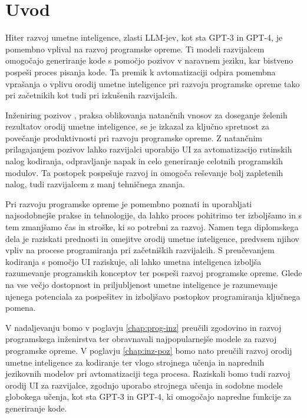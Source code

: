 \documentclass[a4paper,12pt,openright]{book}
\begin{document}
\chapter{Uvod}

Hiter razvoj umetne inteligence, zlasti LLM-jev, kot sta GPT-3 in GPT-4, je pomembno vplival na razvoj programske opreme. Ti modeli razvijalcem omogočajo generiranje kode s pomočjo pozivov v naravnem jeziku, kar bistveno pospeši proces pisanja kode. Ta premik k avtomatizaciji odpira pomembna vprašanja o vplivu orodij umetne inteligence pri razvoju programske opreme tako pri začetnikih kot tudi pri izkušenih razvijalcih.


Inženiring pozivov \cite{baidoo2023education}, praksa oblikovanja natančnih vnosov za doseganje želenih rezultatov orodij umetne inteligence, se je izkazal za ključno spretnost za povečanje produktivnosti pri razvoju programske opreme. Z natančnim prilagajanjem pozivov lahko razvijalci uporabijo UI za avtomatizacijo rutinskih nalog kodiranja, odpravljanje napak in celo generiranje celotnih programskih modulov. Ta postopek pospešuje razvoj in omogoča reševanje bolj zapletenih nalog, tudi razvijalcem z manj tehničnega znanja.

Pri razvoju programske opreme je pomembno poznati in uporabljati najsodobnejše prakse in tehnologije, da lahko proces pohitrimo ter izboljšamo in s tem zmanjšamo čas in stroške, ki so potrebni za razvoj.
Namen tega diplomskega dela je raziskati prednosti in omejitve orodij umetne inteligence, predvsem njihov vpliv na procese programiranja  pri začetniških razvijalcih. S preučevanjem kodiranja s pomočjo UI raziskuje, ali lahko umetna inteligenca izboljša razumevanje programskih konceptov ter pospeši razvoj programske opreme. Glede na vse večjo dostopnost in priljubljenost umetne inteligence je razumevanje njenega potenciala za pospešitev in izboljšavo postopkov programiranja ključnega pomena.

V nadaljevanju bomo v poglavju \ref{chap:prog-inz} preučili zgodovino in razvoj programskega inženirstva ter obravnavali najpopularnejše modele za razvoj programske opreme. V poglavju \ref{chap:inz-poz} bomo nato preučili razvoj orodij umetne inteligence za kodiranje ter vlogo strojnega učenja in naprednih jezikovnih modelov pri avtomatizaciji tega procesa. Raziskali bomo tudi razvoj orodij UI za razvijalce, zgodnjo uporabo strojnega učenja in sodobne modele globokega učenja, kot sta GPT-3 in GPT-4, ki omogočajo napredne funkcije za generiranje kode.
\end{document}
